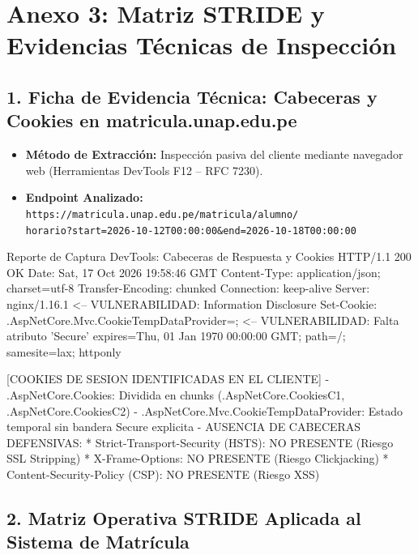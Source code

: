 \newpage
\section*{Anexo 3: Matriz STRIDE y Evidencias Técnicas de Inspección}

\subsection*{1. Ficha de Evidencia Técnica: Cabeceras y Cookies en matricula.unap.edu.pe}
\begin{itemize}[leftmargin=1.5em, itemsep=2pt]
    \item \textbf{Método de Extracción:} Inspección pasiva del cliente mediante navegador web (Herramientas DevTools F12 -- RFC 7230).
    \item \textbf{Endpoint Analizado:} \texttt{https://matricula.unap.edu.pe/matricula/alumno/}\\
    \texttt{horario?start=2026-10-12T00:00:00\&end=2026-10-18T00:00:00}
\end{itemize}

\begin{cmdbox}{Reporte de Captura DevTools: Cabeceras de Respuesta y Cookies}
HTTP/1.1 200 OK
Date: Sat, 17 Oct 2026 19:58:46 GMT
Content-Type: application/json; charset=utf-8
Transfer-Encoding: chunked
Connection: keep-alive
Server: nginx/1.16.1                                  <-- VULNERABILIDAD: Information Disclosure
Set-Cookie: .AspNetCore.Mvc.CookieTempDataProvider=;   <-- VULNERABILIDAD: Falta atributo 'Secure'
            expires=Thu, 01 Jan 1970 00:00:00 GMT; 
            path=/; samesite=lax; httponly

[COOKIES DE SESION IDENTIFICADAS EN EL CLIENTE]
- .AspNetCore.Cookies: Dividida en chunks (.AspNetCore.CookiesC1, .AspNetCore.CookiesC2)
- .AspNetCore.Mvc.CookieTempDataProvider: Estado temporal sin bandera Secure explicita
- AUSENCIA DE CABECERAS DEFENSIVAS:
  * Strict-Transport-Security (HSTS): NO PRESENTE (Riesgo SSL Stripping)
  * X-Frame-Options: NO PRESENTE (Riesgo Clickjacking)
  * Content-Security-Policy (CSP): NO PRESENTE (Riesgo XSS)
\end{cmdbox}

\subsection*{2. Matriz Operativa STRIDE Aplicada al Sistema de Matrícula}

